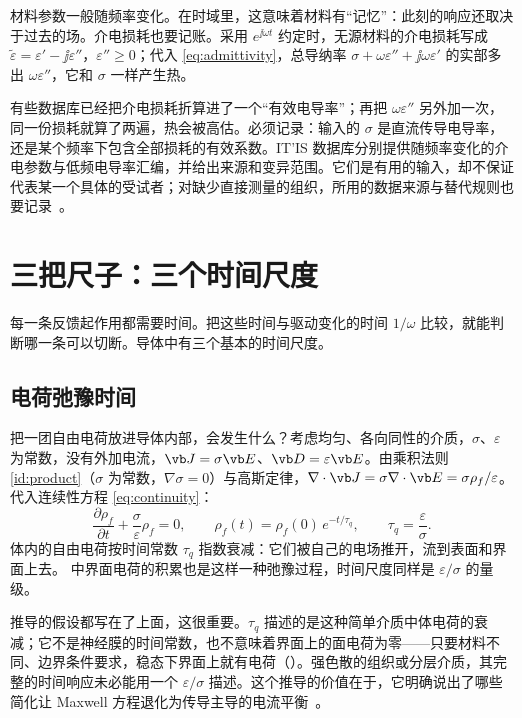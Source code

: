 材料参数一般随频率变化。在时域里，这意味着材料有“记忆”：此刻的响应还取决于过去的场。介电损耗也要记账。采用 $e^{\jj\omega t}$ 约定时，无源材料的介电损耗写成 $\widetilde\varepsilon=\varepsilon'-\jj\varepsilon''$，$\varepsilon''\ge0$；代入 \eqref{eq:admittivity}，总导纳率 $\sigma+\omega\varepsilon''+\jj\omega\varepsilon'$ 的实部多出 $\omega\varepsilon''$，它和 $\sigma$ 一样产生热。

\begin{pitfall}
有些数据库已经把介电损耗折算进了一个“有效电导率”；再把 $\omega\varepsilon''$ 另外加一次，同一份损耗就算了两遍，热会被高估。必须记录：输入的 $\sigma$ 是直流传导电导率，还是某个频率下包含全部损耗的有效系数。IT'IS 数据库分别提供随频率变化的介电参数与低频电导率汇编，并给出来源和变异范围。它们是有用的输入，却不保证代表某一个具体的受试者；对缺少直接测量的组织，所用的数据来源与替代规则也要记录~\cite{itisdielectric,itislf}。
\end{pitfall}

\section{三把尺子：三个时间尺度}\label{sec:regimes-scales}

每一条反馈起作用都需要时间。把这些时间与驱动变化的时间 $1/\omega$ 比较，就能判断哪一条可以切断。导体中有三个基本的时间尺度。

\subsection{电荷弛豫时间}
把一团自由电荷放进导体内部，会发生什么？考虑均匀、各向同性的介质，$\sigma$、$\varepsilon$ 为常数，没有外加电流，$\vb J=\sigma\vb E$、$\vb D=\varepsilon\vb E$。由乘积法则 \eqref{id:product}（$\sigma$ 为常数，$\nabla\sigma=0$）与高斯定律，$\nabla\cdot\vb J=\sigma\nabla\cdot\vb E=\sigma\rho_f/\varepsilon$。代入连续性方程 \eqref{eq:continuity}：
\begin{equation}
\frac{\partial\rho_f}{\partial t}+\frac{\sigma}{\varepsilon}\rho_f=0,
\qquad
\rho_f(t)=\rho_f(0)\,e^{-t/\tau_q},
\qquad \tau_q=\frac{\varepsilon}{\sigma}.
\label{eq:relaxation}
\end{equation}
体内的自由电荷按时间常数 $\tau_q$ 指数衰减：它们被自己的电场推开，流到表面和界面上去。 中界面电荷的积累也是这样一种弛豫过程，时间尺度同样是 $\varepsilon/\sigma$ 的量级。

推导的假设都写在了上面，这很重要。$\tau_q$ 描述的是这种简单介质中体电荷的衰减；它不是神经膜的时间常数，也不意味着界面上的面电荷为零——只要材料不同、边界条件要求，稳态下界面上就有电荷（）。强色散的组织或分层介质，其完整的时间响应未必能用一个 $\varepsilon/\sigma$ 描述。这个推导的价值在于，它明确说出了哪些简化让 Maxwell 方程退化为传导主导的电流平衡~\cite{haus}。

